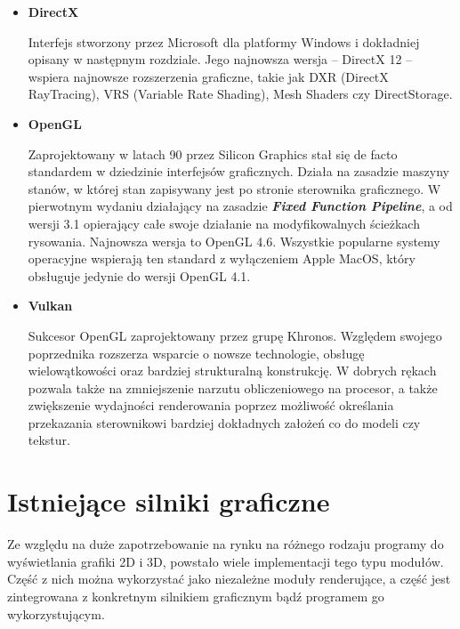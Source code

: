 \begin{itemize}
	\item \textbf{DirectX}

	Interfejs stworzony przez Microsoft dla platformy Windows i dokładniej opisany w następnym rozdziale. Jego najnowsza wersja -- DirectX 12 -- wspiera najnowsze rozszerzenia graficzne, takie jak DXR (DirectX RayTracing), VRS (Variable Rate Shading), Mesh Shaders czy DirectStorage.
	
	\item \textbf{OpenGL}

	Zaprojektowany w latach 90 przez Silicon Graphics stał się de facto standardem w dziedzinie interfejsów graficznych. Działa na zasadzie maszyny stanów, w której stan zapisywany jest po stronie sterownika graficznego. W pierwotnym wydaniu działający na zasadzie \emph{\textbf{Fixed Function Pipeline}}, a od wersji 3.1 opierający całe swoje działanie na modyfikowalnych ścieżkach rysowania. Najnowsza wersja to OpenGL 4.6. Wszystkie popularne systemy operacyjne wspierają ten standard z wyłączeniem Apple MacOS, który obsługuje jedynie do wersji OpenGL 4.1.

	\item \textbf{Vulkan}
	
	Sukcesor OpenGL zaprojektowany przez grupę Khronos. Względem swojego poprzednika rozszerza wsparcie o nowsze technologie, obsługę wielowątkowości oraz bardziej strukturalną konstrukcję. W dobrych rękach pozwala także na zmniejszenie narzutu obliczeniowego na procesor, a także zwiększenie wydajności renderowania poprzez możliwość określania przekazania sterownikowi bardziej dokładnych założeń co do modeli czy tekstur.
\end{itemize}

\section{Istniejące silniki graficzne}

Ze względu na duże zapotrzebowanie na rynku na różnego rodzaju programy do wyświetlania grafiki 2D i 3D, powstało wiele implementacji tego typu modułów. Część z nich można wykorzystać jako niezależne moduły renderujące, a część jest zintegrowana z konkretnym silnikiem graficznym bądź programem go wykorzystującym.

